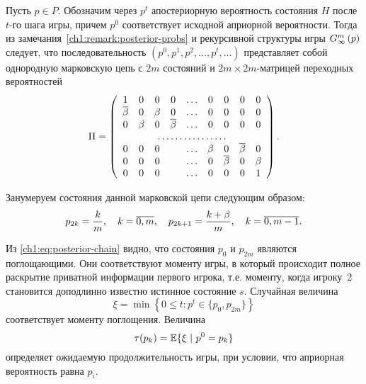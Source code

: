 {Пусть $p \in P$. Обозначим через $p^t$ апостериорную вероятность состояния $H$ после $t$-го шага игры, причем $p^0$ соответствует исходной априорной вероятности.
Тогда из замечания~\ref{ch1:remark:posterior-probs} и рекурсивной структуры игры $G_{\infty}^m\left({p}\right)$ следует, что последовательность $(p^0, p^1, p^2, \ldots, p^t, \ldots)$ представляет собой однородную марковскую цепь с $2m$ состояний и $2m \times 2m$-матрицей переходных вероятностей
\begin{equation}
  \label{ch1:eq:posterior-chain}
  \Pi = 
  \left(
    \begin{array}{ccccccccc}
      1    & 0   & 0   & 0    & \ldots & 0   & 0    & 0    & 0   \\
      \DCo & 0   & \Co & 0    & \ldots & 0   & 0    & 0    & 0   \\
      0    & \Co & 0   & \DCo & \ldots & 0   & 0    & 0    & 0   \\
      \hdotsfor{9}                                               \\
      0    & 0   & 0   &      & \ldots & \Co & 0    & \DCo & 0   \\
      0    & 0   & 0   &      & \ldots & 0   & \DCo & 0    & \Co \\
      0    & 0   & 0   &      & \ldots & 0   & 0    & 0    & 1
    \end{array}
 \right).
\end{equation}

Занумеруем состояния данной марковской цепи следующим образом:
\begin{gather*}
  p_{2k} = \frac{k}{m}, \quad k = \overline{0, m}, \quad
  p_{2k+1} = \frac{k+\beta}{m}, \quad k = \overline{0, m-1}.
\end{gather*}

Из \eqref{ch1:eq:posterior-chain} видно, что состояния $p_0$ и $p_{2m}$ являются поглощающими.
Они соответствуют моменту игры, в который происходит полное раскрытие приватной информации первого игрока, т.е. моменту, когда игроку~2 становится доподлинно известно истинное состояние $s$.
Случайная величина
\begin{equation*}
  \xi = \min \left\{ 0 \leq t: p^t \in \{p_0, p_{2m}\} \right\}
\end{equation*}
соответствует моменту поглощения. Величина
\begin{equation*}
  \tau(p_k) = \operatorname{\mathbb{E}} \{ \xi\ |\ p^0 = p_k \}
\end{equation*}
определяет ожидаемую продолжительность игры, при условии, что априорная вероятность равна $p_i$.

}
